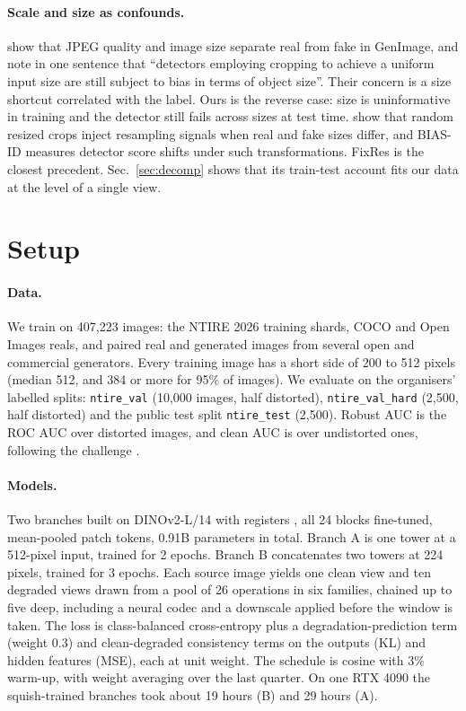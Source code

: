 \documentclass[letterpaper]{article} %
\begin{document}
\paragraph{Scale and size as confounds.} \citet{grommelt2024fakeorjpeg}
show that JPEG quality and image size
separate real from fake in GenImage, and note in one sentence that
``detectors employing cropping to achieve a uniform input size are still
subject to bias in terms of object size''. Their concern is a size shortcut
correlated with the label. Ours is the reverse case: size is uninformative in
training and the detector still fails across sizes at test time. \citet{rajan2025aligned}
show that random resized crops inject
resampling signals when real and fake sizes differ, and BIAS-ID \cite{ricker2026biasid}
measures detector score shifts under such transformations. FixRes \cite{touvron2019fixres}
is the closest precedent. Sec.~\ref{sec:decomp} shows that its train-test
account fits our data at the level of a single view.

\section{Setup}
\label{sec:setup}

\paragraph{Data.} We train on 407,223 images: the NTIRE 2026 training shards,
COCO and Open Images reals, and paired real and generated images from several
open and commercial generators. Every training image has a short side of 200 to
512 pixels (median 512, and 384 or more for 95\% of images). We evaluate on the organisers' labelled splits:
\texttt{ntire\_val} (10,000 images, half distorted), \texttt{ntire\_val\_hard}
(2,500, half distorted) and the public test split \texttt{ntire\_test}
(2,500). Robust AUC is the ROC AUC over distorted images, and clean AUC is
over undistorted ones, following the challenge \cite{gushchin2026ntire}.

\paragraph{Models.} Two branches built on DINOv2-L/14 with
registers \cite{oquab2024dinov2,darcet2024registers}, all 24 blocks
fine-tuned, mean-pooled patch tokens, 0.91B parameters in total. Branch A is
one tower at a 512-pixel input, trained for 2 epochs. Branch B concatenates
two towers at 224 pixels, trained for 3 epochs. Each source image yields one
clean view and ten degraded views drawn from a pool of 26 operations in six
families, chained up to five deep, including a neural codec \cite{balle2018hyperprior}
and a downscale applied before the window is taken. The loss is
class-balanced cross-entropy plus a degradation-prediction term (weight 0.3)
and clean-degraded consistency terms on the outputs (KL) and hidden
features (MSE), each at unit weight. The schedule is cosine with 3\% warm-up, with weight
averaging \cite{izmailov2018swa} over the last quarter. On one RTX 4090 the
squish-trained branches took about 19 hours (B) and 29 hours (A).
\end{document}
